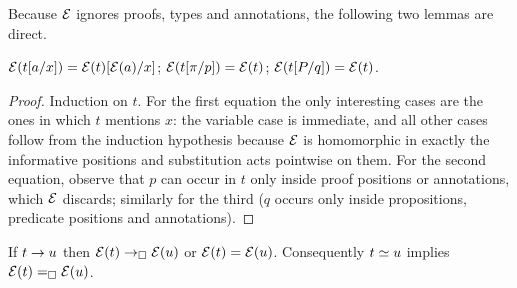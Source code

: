 Because $\mathcal{E}$ ignores proofs, types and annotations, the following two
lemmas are direct.

\begin{lemma}
\label{lem:erase-subst}
$\mathcal{E}(t[a/x]) = \mathcal{E}(t)[\mathcal{E}(a)/x]$;\quad
$\mathcal{E}(t[\pi/p]) = \mathcal{E}(t)$;\quad
$\mathcal{E}(t[P/q]) = \mathcal{E}(t)$.
\end{lemma}

\begin{proof}
Induction on $t$.  For the first equation the only interesting cases are
the ones in which $t$ mentions $x$: the variable case is immediate, and
all other cases follow from the induction hypothesis because $\mathcal{E}$ is
homomorphic in exactly the informative positions and substitution acts
pointwise on them.  For the second equation, observe that $p$ can occur in
$t$ only inside proof positions or annotations, which $\mathcal{E}$ discards;
similarly for the third ($q$ occurs only inside propositions, predicate
positions and annotations).
\end{proof}

\begin{lemma}
\label{lem:erase-sim}
If $t \rightarrow u$ then $\mathcal{E}(t) \rightarrow_{\square} \mathcal{E}(u)$ or $\mathcal{E}(t) =
\mathcal{E}(u)$.  Consequently $t \simeq u$ implies $\mathcal{E}(t) =_{\square}
\mathcal{E}(u)$.
\end{lemma}

